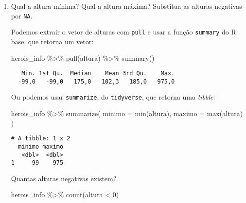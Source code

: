 \documentclass[
  letterpaper,
  DIV=11,
  numbers=noendperiod]{scrreprt}
\newenvironment{Shaded}{\begin{snugshade}}{\end{snugshade}}
\newcommand{\AttributeTok}[1]{\textcolor[rgb]{0.40,0.45,0.13}{#1}}
\newcommand{\DecValTok}[1]{\textcolor[rgb]{0.68,0.00,0.00}{#1}}
\newcommand{\FunctionTok}[1]{\textcolor[rgb]{0.28,0.35,0.67}{#1}}
\newcommand{\NormalTok}[1]{\textcolor[rgb]{0.00,0.23,0.31}{#1}}
\newcommand{\SpecialCharTok}[1]{\textcolor[rgb]{0.37,0.37,0.37}{#1}}
\begin{document}
\begin{enumerate}
\begin{tcolorbox}
  \end{tcolorbox}
\item
  Qual a altura mínima? Qual a altura máxima? Substitua as alturas
  negativas por \texttt{NA}.

  \begin{tcolorbox}[enhanced jigsaw, coltitle=black, colbacktitle=quarto-callout-tip-color!10!white, title=\textcolor{quarto-callout-tip-color}{\faLightbulb}\hspace{0.5em}{Resposta}, toprule=.15mm, leftrule=.75mm, opacityback=0, colback=white, arc=.35mm, breakable, bottomtitle=1mm, left=2mm, toptitle=1mm, titlerule=0mm, rightrule=.15mm, bottomrule=.15mm, opacitybacktitle=0.6, colframe=quarto-callout-tip-color-frame]

  Podemos extrair o vetor de alturas com \texttt{pull} e usar a função
  \texttt{summary} do R base, que retorna um vetor:

\begin{Shaded}
\begin{Highlighting}[]
\NormalTok{herois\_info }\SpecialCharTok{\%\textgreater{}\%} 
  \FunctionTok{pull}\NormalTok{(altura) }\SpecialCharTok{\%\textgreater{}\%} 
  \FunctionTok{summary}\NormalTok{()}
\end{Highlighting}
\end{Shaded}

\begin{verbatim}
   Min. 1st Qu.  Median    Mean 3rd Qu.    Max. 
  -99,0   -99,0   175,0   102,3   185,0   975,0 
\end{verbatim}

  Ou podemos usar \texttt{summarize}, do \texttt{tidyverse}, que retorna
  uma \emph{tibble}:

\begin{Shaded}
\begin{Highlighting}[]
\NormalTok{herois\_info }\SpecialCharTok{\%\textgreater{}\%} 
  \FunctionTok{summarize}\NormalTok{(}
    \AttributeTok{minimo =} \FunctionTok{min}\NormalTok{(altura),}
    \AttributeTok{maximo =} \FunctionTok{max}\NormalTok{(altura)}
\NormalTok{  )}
\end{Highlighting}
\end{Shaded}

\begin{verbatim}
# A tibble: 1 x 2
  minimo maximo
   <dbl>  <dbl>
1    -99    975
\end{verbatim}

  Quantas alturas negativas existem?

\begin{Shaded}
\begin{Highlighting}[]
\NormalTok{herois\_info }\SpecialCharTok{\%\textgreater{}\%} \FunctionTok{count}\NormalTok{(altura }\SpecialCharTok{\textless{}} \DecValTok{0}\NormalTok{)}
\end{Highlighting}
\end{Shaded}


\end{tcolorbox}
\end{enumerate}
\end{document}
